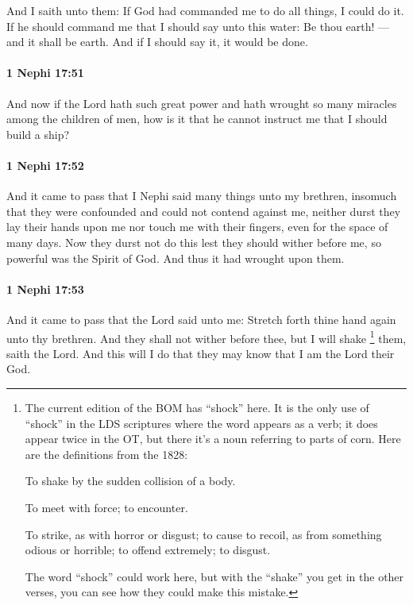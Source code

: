 			And I saith unto them:
			If God had commanded me to do all things,
			I could do it.
			If he should command me
			that I should say unto this water:
			Be thou earth!
			---and it shall be earth.
			And if I should say it,
			it would be done.

		\paragraph{1 Nephi 17:51} %
			\label{1NEPHI-17-51}

			And now if the Lord hath such great power
			and hath wrought so many miracles among the children of men,
			how is it that he cannot instruct me that I should build a ship?

		\paragraph{1 Nephi 17:52} %
			\label{1NEPHI-17-52}

			And it came to pass that I Nephi said many things unto my brethren,
			insomuch that they were confounded and could not contend against me,
			neither durst they lay their hands upon me nor touch me with their fingers,
			even for the space of many days.
			Now they durst not do this lest they should wither before me,
			so powerful was the Spirit of God.
			And thus it had wrought upon them.

		\paragraph{1 Nephi 17:53} %
			\label{1NEPHI-17-53}

			And it came to pass that the Lord said unto me:
			Stretch forth thine hand again unto thy brethren.
			And they shall not wither before thee,
			but I will shake%
				\footnote{%
					\label{1NEPHI-17-53-NOTE-shake}%
					The current edition of the BOM has ``shock'' here. It is the only use of ``shock'' in the LDS scriptures where the word appears as a verb; it does appear twice in the OT, but there it's a noun referring to parts of corn. Here are the definitions from the 1828:
						\begin{compactitem}
							\item[1] To shake by the sudden collision of a body.
							\item[2] To meet with force; to encounter.
							\item[3] To strike, as with horror or disgust; to cause to recoil, as from something odious or horrible; to offend extremely; to disgust.
						\end{compactitem}
					The word ``shock'' could work here, but with the ``shake'' you get in the other verses, you can see how they could make this mistake.
					}
			them, saith the Lord.
			And this will I do that they may know that I am the Lord their God.

